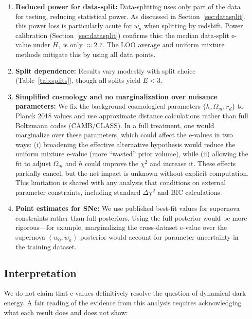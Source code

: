 \documentclass[11pt,a4paper]{article}
\begin{document}
\begin{enumerate}
    \item \textbf{Reduced power for data-split:} Data-splitting uses only part of the data for testing, reducing statistical power. As discussed in Section~\ref{sec:datasplit}, this power loss is particularly acute for $w_a$ when splitting by redshift. Power calibration (Section~\ref{sec:datasplit}) confirms this: the median data-split e-value under $H_1$ is only $\approx 2.7$. The LOO average and uniform mixture methods mitigate this by using all data points.

    \item \textbf{Split dependence:} Results vary modestly with split choice (Table~\ref{tab:splits}), though all splits yield $E < 3$.

    \item \textbf{Simplified cosmology and no marginalization over nuisance parameters:} We fix the background cosmological parameters $\{h, \Omega_m, r_d\}$ to Planck 2018 values and use approximate distance calculations rather than full Boltzmann codes (CAMB/CLASS). In a full treatment, one would marginalize over these parameters, which could affect the e-values in two ways: (i) broadening the effective alternative hypothesis would reduce the uniform mixture e-value (more ``wasted'' prior volume), while (ii) allowing the fit to adjust $\Omega_m$ and $h$ could improve the $\chi^2$ and increase it. These effects partially cancel, but the net impact is unknown without explicit computation. This limitation is shared with any analysis that conditions on external parameter constraints, including standard $\Delta\chi^2$ and BIC calculations.

    \item \textbf{Point estimates for SNe:} We use published best-fit values for supernova constraints rather than full posteriors. Using the full posterior would be more rigorous---for example, marginalizing the cross-dataset e-value over the supernova $(w_0, w_a)$ posterior would account for parameter uncertainty in the training dataset.
\end{enumerate}

\subsection{Interpretation}

We do not claim that e-values definitively resolve the question of dynamical dark energy. A fair reading of the evidence from this analysis requires acknowledging what each result does and does not show:
\end{document}
